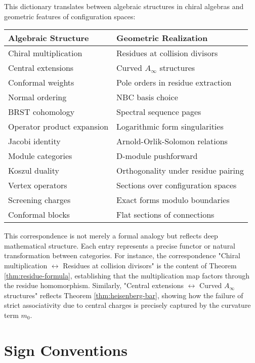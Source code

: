 This dictionary translates between algebraic structures in chiral algebras and geometric features of configuration spaces:

\begin{center}
\begin{tabular}{|l|l|}
\hline
\textbf{Algebraic Structure} & \textbf{Geometric Realization} \\
\hline
Chiral multiplication & Residues at collision divisors \\
Central extensions & Curved $A_\infty$ structures \\
Conformal weights & Pole orders in residue extraction \\
Normal ordering & NBC basis choice \\
BRST cohomology & Spectral sequence pages \\
Operator product expansion & Logarithmic form singularities \\
Jacobi identity & Arnold-Orlik-Solomon relations \\
Module categories & D-module pushforward \\
Koszul duality & Orthogonality under residue pairing \\
Vertex operators & Sections over configuration spaces \\
Screening charges & Exact forms modulo boundaries \\
Conformal blocks & Flat sections of connections \\
\hline
\end{tabular}
\end{center}

\begin{remark}
This correspondence is not merely a formal analogy but reflects deep mathematical structure. Each entry represents a precise functor or natural transformation between categories. For instance, the correspondence "Chiral multiplication $\leftrightarrow$ Residues at collision divisors" is the content of Theorem \ref{thm:residue-formula}, establishing that the multiplication map factors through the residue homomorphism. Similarly, "Central extensions $\leftrightarrow$ Curved $A_\infty$ structures" reflects Theorem \ref{thm:heisenberg-bar}, showing how the failure of strict associativity due to central charges is precisely captured by the curvature term $m_0$.
\end{remark}


 
\section{Sign Conventions}
 
